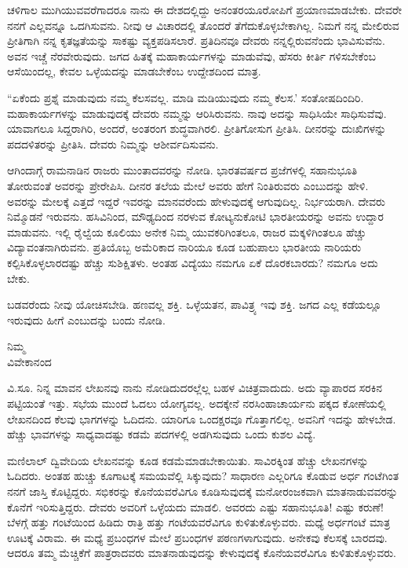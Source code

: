 ಚಳಿಗಾಲ ಮುಗಿಯುವವರೆಗಾದರೂ ನಾನು ಈ ದೇಶದಲ್ಲಿದ್ದು ಅನಂತರ\break ಯೂರೋಪಿಗೆ ಪ್ರಯಾಣಮಾಡಬೇಕು. ದೇವರೇ ನನಗೆ ಎಲ್ಲವನ್ನೂ ಒದಗಿಸುವನು. ನೀವು ಆ ವಿಚಾರದಲ್ಲಿ ತೊಂದರೆ ತೆಗೆದುಕೊಳ್ಳಬೇಕಾಗಿಲ್ಲ. ನಿಮಗೆ ನನ್ನ ಮೇಲಿರುವ ಪ್ರೀತಿಗಾಗಿ ನನ್ನ ಕೃತಜ್ಞತೆಯನ್ನು ಸಾಕಷ್ಟು ವ್ಯಕ್ತಪಡಿಸಲಾರೆ. ಪ್ರತಿದಿನವೂ ದೇವರು ನನ್ನಲ್ಲಿರುವನೆಂದು ಭಾವಿಸುವೆನು. ಅವನ ಇಚ್ಚೆ ನೆರವೇರುವುದು. ಜಗದ ಹಿತಕ್ಕೆ ಮಹಾಕಾರ್ಯಗಳನ್ನು ಮಾಡುವೆವು, ಹೆಸರು ಕೀರ್ತಿ ಗಳಿಸಬೇಕೆಂಬ ಆಸೆಯಿಂದಲ್ಲ, ಕೇವಲ ಒಳ್ಳೆಯದನ್ನು ಮಾಡಬೇಕೆಂಬ ಉದ್ದೇಶದಿಂದ ಮಾತ್ರ.

“ಏಕೆಂದು ಪ್ರಶ್ನೆ ಮಾಡುವುದು ನಮ್ಮ ಕೆಲಸವಲ್ಲ. ಮಾಡಿ ಮಡಿಯುವುದು ನಮ್ಮ ಕೆಲಸ.' ಸಂತೋಷದಿಂದಿರಿ. ಮಹಾಕಾರ್ಯಗಳನ್ನು ಮಾಡುವುದಕ್ಕೆ ದೇವರು ನಮ್ಮನ್ನು ಆರಿಸಿರುವನು. ನಾವು ಅದನ್ನು ಸಾಧಿಸಿಯೇ ಸಾಧಿಸುವೆವು. ಯಾವಾಗಲೂ ಸಿದ್ದರಾಗಿರಿ, ಅಂದರೆ, ಅಂತರಂಗ ಶುದ್ಧವಾಗಿರಲಿ. ಪ್ರೀತಿಗೋಸುಗ ಪ್ರೀತಿಸಿ. ದೀನರನ್ನು ದುಃಖಿಗಳನ್ನು ಪದದಳಿತರನ್ನು ಪ್ರೀತಿಸಿ. ದೇವರು ನಿಮ್ಮನ್ನು ಆಶೀರ್ವದಿಸುವನು.

ಆಗಿಂದಾಗ್ಗೆ ರಾಮನಾಡಿನ ರಾಜರು ಮುಂತಾದವರನ್ನು ನೋಡಿ. ಭಾರತವರ್ಷದ ಪ್ರಜೆಗಳಲ್ಲಿ ಸಹಾನುಭೂತಿ ತೋರುವಂತೆ ಅವರನ್ನು ಪ್ರೇರೇಪಿಸಿ. ದೀನರ ತಲೆಯ ಮೇಲೆ ಅವರು ಹೇಗೆ ನಿಂತಿರುವರು ಎಂಬುದನ್ನು ಹೇಳಿ. ಅವರನ್ನು ಮೇಲಕ್ಕೆ ಎತ್ತದೆ ಇದ್ದರೆ ಇವರನ್ನು ಮಾನವರೆಂದು ಹೇಳುವುದಕ್ಕೆ ಆಗುವುದಿಲ್ಲ. ನಿರ್ಭಯರಾಗಿ. ದೇವರು ನಿಮ್ಮೊಡನೆ ಇರುವನು. ಹಸಿವಿನಿಂದ, ಮೌಢ್ಯದಿಂದ ನರಳುವ ಕೋಟ್ಯನುಕೋಟಿ ಭಾರತೀಯರನ್ನು ಅವನು ಉದ್ದಾರ ಮಾಡುವನು. ಇಲ್ಲಿ ರೈಲ್ವೆಯ ಕೂಲಿಯು ಅನೇಕ ನಿಮ್ಮ ಯುವಕರಿಗಿಂತಲೂ, ರಾಜರ ಮಕ್ಕಳಿಗಿಂತಲೂ ಹೆಚ್ಚು ವಿದ್ಯಾವಂತನಾಗಿರುವನು. ಪ್ರತಿಯೊಬ್ಬ ಅಮೆರಿಕಾದ ನಾರಿಯೂ ಕೂಡ ಬಹುಪಾಲು ಭಾರತೀಯ ನಾರಿಯರು ಕಲ್ಪಿಸಿಕೊಳ್ಳಲಾರದಷ್ಟು ಹೆಚ್ಚು ಸುಶಿಕ್ಷಿತಳು. ಅಂತಹ ವಿದ್ಯೆಯು ನಮಗೂ ಏಕೆ ದೊರಕಬಾರದು? ನಮಗೂ ಅದು ಬೇಕು.

ಬಡವರೆಂದು ನೀವು ಯೋಚಿಸಬೇಡಿ. ಹಣವಲ್ಲ ಶಕ್ತಿ. ಒಳ್ಳೆಯತನ, ಪಾವಿತ್ರ್ಯ ಇವು ಶಕ್ತಿ. ಜಗದ ಎಲ್ಲ ಕಡೆಯಲ್ಲೂ ಇರುವುದು ಹೀಗೆ ಎಂಬುದನ್ನು ಬಂದು ನೋಡಿ.

\vspace{-0.5cm}

{\flushright
ನಿಮ್ಮ\\ವಿವೇಕಾನಂದ\par}

ವಿ.ಸೂ. \enginline{-}ನಿನ್ನ ಮಾವನ ಲೇಖನವು ನಾನು ನೋಡಿದುದರಲ್ಲೆಲ್ಲ ಬಹಳ ವಿಚಿತ್ರ\break ವಾದುದು. ಅದು ವ್ಯಾಪಾರದ ಸರಕಿನ ಪಟ್ಟಿಯಂತೆ ಇತ್ತು. ಸಭೆಯ ಮುಂದೆ ಓದಲು ಯೋಗ್ಯವಲ್ಲ. ಅದಕ್ಕೇನೆ ನರಸಿಂಹಾಚಾರ್ಯನು ಪಕ್ಕದ ಕೋಣೆಯಲ್ಲಿ ಲೇಖನದಿಂದ ಕೆಲವು ಭಾಗಗಳನ್ನು ಓದಿದನು. ಯಾರಿಗೂ ಒಂದಕ್ಷರವೂ ಗೊತ್ತಾಗಲಿಲ್ಲ. ಅವನಿಗೆ ಇದನ್ನು ಹೇಳಬೇಡ. ಹೆಚ್ಚು ಭಾವಗಳನ್ನು ಸಾಧ್ಯವಾದಷ್ಟು ಕಡಮೆ ಪದಗಳಲ್ಲಿ ಅಡಗಿಸುವುದು ಒಂದು ಕುಶಲ ವಿದ್ಯೆ.

ಮಣಿಲಾಲ್ ದ್ವಿವೇದಿಯ ಲೇಖನವನ್ನು ಕೂಡ ಕಡಮೆಮಾಡಬೇಕಾಯಿತು. ಸಾವಿರ\break ಕ್ಕಿಂತ ಹೆಚ್ಚು ಲೇಖನಗಳನ್ನು ಓದಿದರು. ಅಂತಹ ಹುಚ್ಚು ಕೂಗಾಟಕ್ಕೆ ಸಮಯವೆಲ್ಲಿ ಸಿಕ್ಕುವುದು? ಸಾಧಾರಣ ಎಲ್ಲರಿಗೂ ಕೊಡುವ ಅರ್ಧ ಗಂಟೆಗಿಂತ ನನಗೆ ಜಾಸ್ತಿ ಕೊಟ್ಟಿದ್ದರು. ಸಭಿಕರನ್ನು ಕೊನೆಯವರೆವಿಗೂ ಕೂಡಿಸುವುದಕ್ಕೆ ಮನೋರಂಜಕವಾಗಿ ಮಾತನಾಡುವವರನ್ನು ಕೊನೆಗೆ ಇರಿಸುತ್ತಿದ್ದರು. ದೇವರು ಅವರಿಗೆ ಒಳ್ಳೆಯದು ಮಾಡಲಿ. ಅವರದು ಎಷ್ಟು ಸಹಾನುಭೂತಿ! ಎಷ್ಟು ಕರುಣೆ! ಬೆಳಗ್ಗೆ ಹತ್ತು ಗಂಟೆಯಿಂದ ಹಿಡಿದು ರಾತ್ರಿ ಹತ್ತು ಗಂಟೆಯವರೆವಿಗೂ ಕುಳಿತುಕೊಳ್ಳುವರು. ಮಧ್ಯೆ ಅರ್ಧಗಂಟೆ ಮಾತ್ರ ಊಟಕ್ಕೆ ವಿರಾಮ. ಈ ಮಧ್ಯೆ ಪ್ರಬಂಧಗಳ ಮೇಲೆ ಪ್ರಬಂಧಗಳ ಪಠಣಗಳಾಗುವುದು. ಅನೇಕವು ಕೆಲಸಕ್ಕೆ ಬಾರದವು. ಆದರೂ ತಮ್ಮ ಮೆಚ್ಚಿಕೆಗೆ ಪಾತ್ರರಾದವರು ಮಾತನಾಡುವುದನ್ನು ಕೇಳುವುದಕ್ಕೆ ಕೊನೆಯವರೆವಿಗೂ ಕುಳಿತುಕೊಳ್ಳುವರು.

